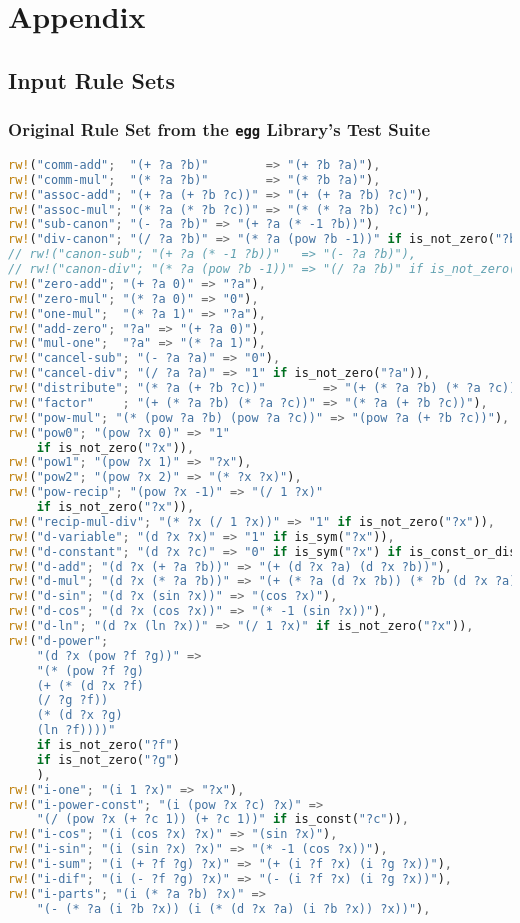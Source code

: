 \chapter{Appendix}
\label{chap:appendix}

\section{Input Rule Sets}
\label{app:rule_sets}

\subsection{Original Rule Set from the \texttt{egg} Library’s Test Suite~\citep{egg_math_rules}}
\label{app:base_rules}
\begin{lstlisting}[language=Rust, caption={Base arithmetic rule set from \texttt{egg}'s \texttt{math.rs}.}, label={lst:base-rules}]
rw!("comm-add";  "(+ ?a ?b)"        => "(+ ?b ?a)"),
rw!("comm-mul";  "(* ?a ?b)"        => "(* ?b ?a)"),
rw!("assoc-add"; "(+ ?a (+ ?b ?c))" => "(+ (+ ?a ?b) ?c)"),
rw!("assoc-mul"; "(* ?a (* ?b ?c))" => "(* (* ?a ?b) ?c)"),	
rw!("sub-canon"; "(- ?a ?b)" => "(+ ?a (* -1 ?b))"),
rw!("div-canon"; "(/ ?a ?b)" => "(* ?a (pow ?b -1))" if is_not_zero("?b")),
// rw!("canon-sub"; "(+ ?a (* -1 ?b))"   => "(- ?a ?b)"),
// rw!("canon-div"; "(* ?a (pow ?b -1))" => "(/ ?a ?b)" if is_not_zero("?b")),	
rw!("zero-add"; "(+ ?a 0)" => "?a"),
rw!("zero-mul"; "(* ?a 0)" => "0"),
rw!("one-mul";  "(* ?a 1)" => "?a"),	
rw!("add-zero"; "?a" => "(+ ?a 0)"),
rw!("mul-one";  "?a" => "(* ?a 1)"),	
rw!("cancel-sub"; "(- ?a ?a)" => "0"),
rw!("cancel-div"; "(/ ?a ?a)" => "1" if is_not_zero("?a")),	
rw!("distribute"; "(* ?a (+ ?b ?c))"        => "(+ (* ?a ?b) (* ?a ?c))"),
rw!("factor"    ; "(+ (* ?a ?b) (* ?a ?c))" => "(* ?a (+ ?b ?c))"),	
rw!("pow-mul"; "(* (pow ?a ?b) (pow ?a ?c))" => "(pow ?a (+ ?b ?c))"),
rw!("pow0"; "(pow ?x 0)" => "1"
	if is_not_zero("?x")),
rw!("pow1"; "(pow ?x 1)" => "?x"),
rw!("pow2"; "(pow ?x 2)" => "(* ?x ?x)"),
rw!("pow-recip"; "(pow ?x -1)" => "(/ 1 ?x)"
	if is_not_zero("?x")),
rw!("recip-mul-div"; "(* ?x (/ 1 ?x))" => "1" if is_not_zero("?x")),	
rw!("d-variable"; "(d ?x ?x)" => "1" if is_sym("?x")),
rw!("d-constant"; "(d ?x ?c)" => "0" if is_sym("?x") if is_const_or_distinct_var("?c", "?x")),	
rw!("d-add"; "(d ?x (+ ?a ?b))" => "(+ (d ?x ?a) (d ?x ?b))"),
rw!("d-mul"; "(d ?x (* ?a ?b))" => "(+ (* ?a (d ?x ?b)) (* ?b (d ?x ?a)))"),	
rw!("d-sin"; "(d ?x (sin ?x))" => "(cos ?x)"),
rw!("d-cos"; "(d ?x (cos ?x))" => "(* -1 (sin ?x))"),	
rw!("d-ln"; "(d ?x (ln ?x))" => "(/ 1 ?x)" if is_not_zero("?x")),	
rw!("d-power";
	"(d ?x (pow ?f ?g))" =>
	"(* (pow ?f ?g)
	(+ (* (d ?x ?f)
	(/ ?g ?f))
	(* (d ?x ?g)
	(ln ?f))))"
	if is_not_zero("?f")
	if is_not_zero("?g")
	),	
rw!("i-one"; "(i 1 ?x)" => "?x"),
rw!("i-power-const"; "(i (pow ?x ?c) ?x)" =>
	"(/ (pow ?x (+ ?c 1)) (+ ?c 1))" if is_const("?c")),
rw!("i-cos"; "(i (cos ?x) ?x)" => "(sin ?x)"),
rw!("i-sin"; "(i (sin ?x) ?x)" => "(* -1 (cos ?x))"),
rw!("i-sum"; "(i (+ ?f ?g) ?x)" => "(+ (i ?f ?x) (i ?g ?x))"),
rw!("i-dif"; "(i (- ?f ?g) ?x)" => "(- (i ?f ?x) (i ?g ?x))"),
rw!("i-parts"; "(i (* ?a ?b) ?x)" =>
	"(- (* ?a (i ?b ?x)) (i (* (d ?x ?a) (i ?b ?x)) ?x))"),
\end{lstlisting}

